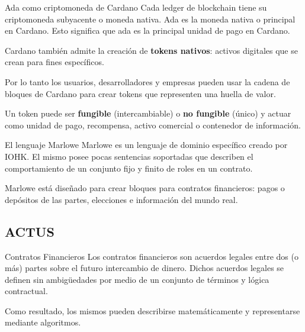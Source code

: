 \documentclass{beamer}
\begin{document}
\begin{frame}{Ada como criptomoneda de Cardano}
Cada ledger de blockchain tiene su criptomoneda subyacente o moneda nativa. Ada es la moneda
nativa o principal en Cardano. Esto significa que ada es la principal unidad de pago en Cardano.

\pause
\medskip

Cardano también admite la creación de \textbf{tokens nativos}: activos digitales que se crean para fines
específicos. 

\medskip
\pause

Por lo tanto los usuarios, desarrolladores y empresas pueden usar la cadena de bloques de Cardano para crear tokens que representen una huella de valor.

\pause
\medskip

Un token puede ser \textbf{fungible} (intercambiable) o \textbf{no fungible} (único) y actuar como unidad de pago, recompensa, activo
comercial o contenedor de información.

\end{frame}

\begin{frame}{El lenguaje Marlowe}
Marlowe es un lenguaje de dominio específico creado por IOHK. El mismo posee pocas sentencias soportadas que describen el comportamiento de un conjunto fijo y finito de roles en un contrato.

\vfill

Marlowe está diseñado para crear bloques para contratos financieros: pagos o depósitos de las partes, elecciones e información del mundo real.
\end{frame}



\subsection{ACTUS}

\begin{frame}{Contratos Financieros}
Los contratos financieros son acuerdos legales entre dos (o más) partes sobre el futuro intercambio de dinero. Dichos acuerdos legales se definen sin ambigüedades por medio de un conjunto de términos y lógica contractual.

\pause
\vfill

Como resultado, los mismos pueden describirse matemáticamente y representarse mediante algoritmos.

\end{frame}
\end{document}
